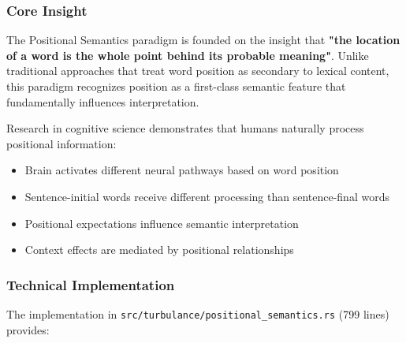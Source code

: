 \documentclass[12pt,a4paper,twoside]{article}
\begin{document}
\subsubsection{Core Insight}

The Positional Semantics paradigm is founded on the insight that \textbf{"the location of a word is the whole point behind its probable meaning"}. Unlike traditional approaches that treat word position as secondary to lexical content, this paradigm recognizes position as a first-class semantic feature that fundamentally influences interpretation.

Research in cognitive science demonstrates that humans naturally process positional information:
\begin{itemize}
\item Brain activates different neural pathways based on word position
\item Sentence-initial words receive different processing than sentence-final words
\item Positional expectations influence semantic interpretation
\item Context effects are mediated by positional relationships
\end{itemize}

\subsubsection{Technical Implementation}

The implementation in \texttt{src/turbulance/positional\_semantics.rs} (799 lines) provides:
\end{document}
